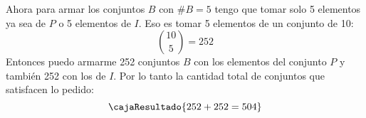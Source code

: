 \begin{enumerate}[label=\enumeracion]
        Ahora para armar los conjuntos $B$ con $\#B = 5$ tengo que tomar solo 5
        elementos ya sea de $P$ o 5 elementos de $I$. Eso es tomar 5 elementos de un conjunto de 10:
        $$
          \binom{10}{5} = 252
        $$
        Entonces puedo armarme 252 conjuntos $B$ con los elementos del conjunto $P$
        y también 252 con los de $I$. Por lo tanto la cantidad total de conjuntos que satisfacen lo pedido:
        $$
          \cajaResultado{252 + 252 = 504}
        $$
\end{enumerate}

\begin{aportes}
  \item {}
  \item {}
  \item {}
\end{aportes}
